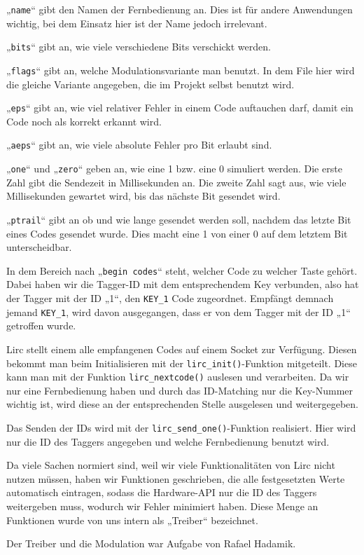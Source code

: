 „\texttt{name}“ gibt den Namen der Fernbedienung an. Dies ist für andere Anwendungen wichtig,
bei dem Einsatz hier ist der Name jedoch irrelevant.

„\texttt{bits}“ gibt an, wie viele verschiedene Bits verschickt werden.

„\texttt{flags}“ gibt an, welche Modulationsvariante man benutzt. In dem File hier wird die gleiche Variante angegeben,
die im Projekt selbst benutzt wird.

„\texttt{eps}“ gibt an, wie viel relativer Fehler in einem Code auftauchen darf, damit ein Code noch als korrekt erkannt wird.

„\texttt{aeps}“ gibt an, wie viele absolute Fehler pro Bit erlaubt sind.

„\texttt{one}“ und „\texttt{zero}“ geben an, wie eine 1 bzw. eine 0 simuliert werden.
Die erste Zahl gibt die Sendezeit in Millisekunden an. Die zweite Zahl sagt aus, wie viele Millisekunden gewartet wird,
bis das nächste Bit gesendet wird.

„\texttt{ptrail}“ gibt an ob und wie lange gesendet werden soll, nachdem das letzte Bit eines Codes gesendet wurde. 
Dies macht eine 1 von einer 0 auf dem letztem Bit unterscheidbar.

In dem Bereich nach „\texttt{begin codes}“ steht, welcher Code zu welcher Taste gehört. Dabei haben wir die Tagger-ID mit dem
entsprechendem Key verbunden, also hat der Tagger mit der ID „1“, den \texttt{KEY_1} Code zugeordnet. Empfängt demnach
jemand \texttt{KEY_1}, wird davon ausgegangen, dass er von dem Tagger mit der ID „1“ getroffen wurde.

Lirc stellt einem alle empfangenen Codes auf einem Socket zur Verfügung. Diesen bekommt man beim Initialisieren mit der
\texttt{lirc\_init()}-Funktion mitgeteilt.
Diese kann man mit der Funktion \texttt{lirc\_nextcode()} auslesen und verarbeiten. Da wir nur eine Fernbedienung haben
und durch das ID-Matching nur die Key-Nummer wichtig ist, wird diese an der entsprechenden Stelle ausgelesen und weitergegeben.

Das Senden der IDs wird mit der \texttt{lirc\_send\_one()}-Funktion realisiert. Hier wird nur die ID des Taggers angegeben
und welche Fernbedienung benutzt wird.

Da viele Sachen normiert sind, weil wir viele Funktionalitäten von Lirc nicht nutzen müssen, haben wir Funktionen geschrieben,
die alle festgesetzten Werte automatisch eintragen, sodass die Hardware-API nur die ID des Taggers weitergeben muss,
wodurch wir Fehler minimiert haben. Diese Menge an Funktionen wurde von uns intern als „Treiber“ bezeichnet.

Der Treiber und die Modulation war Aufgabe von Rafael Hadamik. 